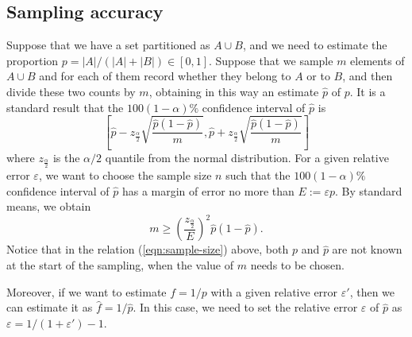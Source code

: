 \documentclass[a4paper,11pt]{article}
\newcommand{\kristoffer}[1]{{\color{red}{#1}}}
\newcommand{\alex}[1]{{\color{blue}{#1}}}
\renewcommand{\geq}{\geqslant}
\begin{document}



\subsection{Sampling accuracy\label{sec:sampling-accuracy}}

Suppose that we have a set partitioned as $A \cup B$, and we need to estimate the proportion $p = |A| / (|A| + |B|) \in [0,1]$. Suppose that we sample $m$ elements of $A \cup B$ and for each of them record whether they belong to $A$ or to $B$, and then divide these two counts by $m$, obtaining in this way an estimate $\hat{p}$ of $p$. It is a standard result that the $100(1-\alpha)\%$ confidence interval of $\hat{p}$ is
\[\left[\hat{p} - z_{\frac{\alpha}{2}}\sqrt{\frac{\hat{p}(1-\hat{p})}{m}} , \hat{p} + z_{\frac{\alpha}{2}}\sqrt{\frac{\hat{p}(1-\hat{p})}{m}}\right] \]
where $z_{\frac{\alpha}{2}}$ is the $\alpha/2$ quantile from the normal distribution. For a given relative error $\varepsilon$, we want to choose the sample size $n$ such that the $100(1-\alpha)\%$ confidence interval of $\hat{p}$ has a margin of error no more than $E := \varepsilon p$. By standard means, we obtain
\begin{equation}
	m \geq \left(\frac{z_{\frac{\alpha}{2}}}{E}\right)^2\hat{p}(1-\hat{p}).
	\label{eqn:sample-size}
\end{equation}
Notice that in the relation (\ref{eqn:sample-size}) above, both $p$ and $\hat{p}$ are not known at the start of the sampling, when the value of $m$ needs to be chosen. 

\alex{In our case, we choose $p$ and $\hat{p}$ ...  }

Moreover, if we want to estimate $f = 1/p$ with a given relative error $\varepsilon'$, then we can estimate it as $\hat{f} = 1/\hat{p}$. In this case, we need to set the relative error $\varepsilon$ of $\hat{p}$ as $\varepsilon = 1/(1+\varepsilon') - 1$. 
\kristoffer{I stop here with the note that I have to clarify the last part in this section (i.e f=1/p) a bit. Also, we need to illustrate how it works in practice (inital estimate, then updating sample size as we go for a fixed epsilon= say 0.05)}

\end{document}

